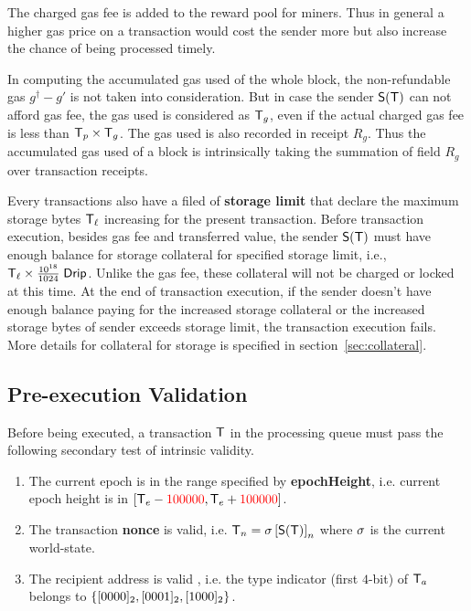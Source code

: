 	
The charged gas fee is added to the reward pool for miners. Thus in general a higher gas price on a transaction would cost the sender more but also increase the chance of being processed timely.

In computing the accumulated gas used of the whole block, the non-refundable gas $g^{\dagger} - g'$ is not taken into consideration. But in case the sender $\mathsf{S}{\left({\textsf{T}} \right)}$ can not afford gas fee, the gas used is considered as $\textsf{T}_g$, even if the actual charged gas fee is less than $\textsf{T}_p\times\textsf{T}_g$. The gas used is also recorded in receipt $R_g$. 
%
Thus the accumulated gas used of a block is intrinsically taking the summation of field $R_g$ over transaction receipts.

Every transactions also have a filed of \textbf{storage limit} that declare the maximum storage bytes $\textsf{T}_\ell$ increasing for the present transaction. Before transaction execution, besides gas fee and transferred value, the sender $\mathsf{S}{\left({\textsf{T}} \right)}$ must have enough balance for storage collateral for specified storage limit, i.e., $\textsf{T}_\ell\times\frac{10^{18}}{1024}\;{\sf Drip}$. Unlike the gas fee, these collateral will not be charged or locked at this time. At the end of transaction execution, if the sender doesn't have enough balance paying for the increased storage collateral or the increased storage bytes of sender exceeds storage limit, the transaction execution fails. More details for collateral for storage is specified in section~\ref{sec:collateral}. 

\subsection{Pre-execution Validation}
\label{sec:tx validate}

Before being executed, a transaction $\textsf{T}$ in the processing queue must pass the following secondary test of intrinsic validity. 
\begin{enumerate}[nosep]
	\item The current epoch is in the range specified by \textbf{epochHeight}, 
	i.e. current epoch height is in $[\textsf{T}_e - {\color{red}100000}, \textsf{T}_e + {\color{red}100000}]$.
	
	\item The transaction \textbf{nonce} is valid,
   i.e. $\textsf{T}_n = \mathbf{\sigma}\left[\mathsf{S}{\left({\textsf{T}} \right)}\right]_n$ where $\mathbf{\sigma}$ is the current world-state.

   \item The recipient address is valid , i.e. the type indicator (first $4$-bit) of $\textsf{T}_a$ belongs to ${\left \{{[0000]_2,[0001]_2,[1000]_2} \right \}}$.
\end{enumerate}

